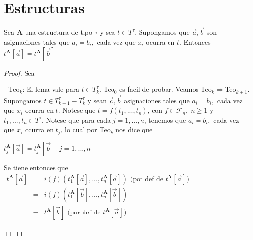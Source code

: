 \section{Estructuras}

  \begin{lemma}
    Sea \(\mathbf{A}\) una estructura de tipo \(\tau \) y sea \(t\in T^{\tau }\). Supongamos que \(\vec{a},\vec{b}\) son asignaciones tales que \(a_{i}=b_{i},\) cada vez que \(x_{i}\) ocurra en \(t\). Entonces \(t^{ \mathbf{A}}[\vec{a}]=t^{\mathbf{A}}[\vec{b}]\).
  \end{lemma}
  \begin{proof}
    Sea

    - Teo\(_{k}\): El lema vale para \(t\in T_{k}^{\tau }\).
    Teo\(_{0}\) es facil de probar. Veamos Teo\(_{k}\Rightarrow \)Teo\(_{k+1}\). Supongamos \(t\in T_{k+1}^{\tau }-T_{k}^{\tau }\) y sean \(\vec{a},\vec{b}\) asignaciones tales que \(a_{i}=b_{i},\) cada vez que \(x_{i}\) ocurra en \(t\). Notese que \(t=f(t_{1},...,t_{n})\), con \(f\in \mathcal{F}_{n},\;n\geq 1\) y \( t_{1},...,t_{n}\in T^{\tau }\). Notese que para cada \(j=1,...,n\), tenemos que \(a_{i}=b_{i},\) cada vez que \(x_{i}\) ocurra en \(t_{j}\), lo cual por Teo\(_{k}\) nos dice que

    \(\displaystyle t_{j}^{\mathbf{A}}[\vec{a}]=t_{j}^{\mathbf{A}}[\vec{b}]\text{, }j=1,...,n \)

    Se tiene entonces que
    \(\displaystyle \begin{array}{ccl} t^{\mathbf{A}}[\vec{a}] & = & i(f)(t_{1}^{\mathbf{A}}[\vec{a}],...,t_{n}^{ \mathbf{A}}[\vec{a}])\text{ (por def de }t^{\mathbf{A}}[\vec{a}]\text{)} \\ & = & i(f)(t_{1}^{\mathbf{A}}[\vec{b}],...,t_{n}^{\mathbf{A}}[\vec{b}]) \\ & = & t^{\mathbf{A}}[\vec{b}]\text{ (por def de }t^{\mathbf{A}}[\vec{a}] \text{)} \end{array} \)

    \(\Box\)
  \end{proof}

